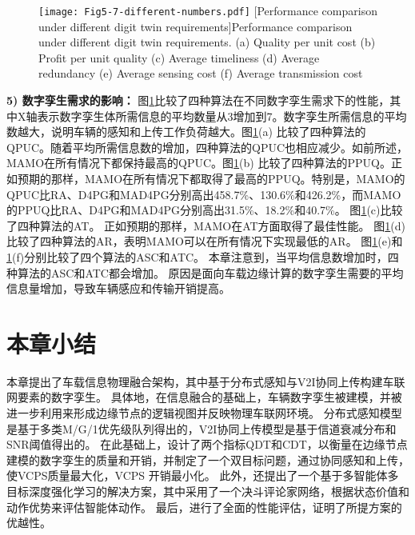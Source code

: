 \begin{figure}[h]
 \centering
 \texttt{[image: Fig5-7-different-numbers.pdf]}
 [Performance comparison under different digit twin requirements]{Performance comparison under different digit twin requirements. (a) Quality per unit cost (b) Profit per unit quality (c) Average timeliness (d) Average redundancy (e) Average sensing cost (f) Average transmission cost}
 \label{fig 5-7}
\end{figure}

\textbf{5) 数字孪生需求的影响：}
图\ref{fig 5-7}比较了四种算法在不同数字孪生需求下的性能，其中X轴表示数字孪生体所需信息的平均数量从3增加到7。数字孪生所需信息的平均数越大，说明车辆的感知和上传工作负荷越大。图\ref{fig 5-7}(a) 比较了四种算法的QPUC。随着平均所需信息数的增加，四种算法的QPUC也相应减少。如前所述，MAMO在所有情况下都保持最高的QPUC。图\ref{fig 5-7}(b) 比较了四种算法的PPUQ。正如预期的那样，MAMO在所有情况下都取得了最高的PPUQ。特别是，MAMO的QPUC比RA、D4PG和MAD4PG分别高出458.7\%、130.6\%和426.2\%，而MAMO的PPUQ比RA、D4PG和MAD4PG分别高出31.5\%、18.2\%和40.7\%。
图\ref{fig 5-7}(c)比较了四种算法的AT。
正如预期的那样，MAMO在AT方面取得了最佳性能。
图\ref{fig 5-7}(d)比较了四种算法的AR，表明MAMO可以在所有情况下实现最低的AR。
图\ref{fig 5-7}(e)和\ref{fig 5-7}(f)分别比较了四个算法的ASC和ATC。
本章注意到，当平均信息数增加时，四种算法的ASC和ATC都会增加。
原因是面向车载边缘计算的数字孪生需要的平均信息量增加，导致车辆感应和传输开销提高。

\section{本章小结}\label{section 5-7}

本章提出了车载信息物理融合架构，其中基于分布式感知与V2I协同上传构建车联网要素的数字孪生。
具体地，在信息融合的基础上，车辆数字孪生被建模，并被进一步利用来形成边缘节点的逻辑视图并反映物理车联网环境。
分布式感知模型是基于多类M/G/1优先级队列得出的，V2I协同上传模型是基于信道衰减分布和SNR阈值得出的。
在此基础上，设计了两个指标QDT和CDT，以衡量在边缘节点建模的数字孪生的质量和开销，并制定了一个双目标问题，通过协同感知和上传，使VCPS质量最大化，VCPS 开销最小化。
此外，还提出了一个基于多智能体多目标深度强化学习的解决方案，其中采用了一个决斗评论家网络，根据状态价值和动作优势来评估智能体动作。
最后，进行了全面的性能评估，证明了所提方案的优越性。
